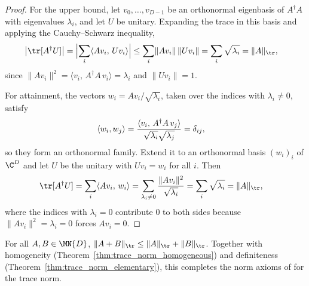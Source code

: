 \begin{proof}\leanok
    For the upper bound, let $v_0,\ldots,v_{D-1}$ be an orthonormal
    eigenbasis of $A^\dagger A$ with eigenvalues $\lambda_i$, and let $U$ be
    unitary. Expanding the trace in this basis and applying the
    Cauchy--Schwarz inequality,
    \begin{align}
        \bigl|\tr[A^\dagger U]\bigr|
        &=\Bigl|\sum_i\langle Av_i,\,Uv_i\rangle\Bigr|
          \leq\sum_i\lVert Av_i\rVert\,\lVert Uv_i\rVert
          =\sum_i\sqrt{\lambda_i}
          =\lVert A\rVert_{\tr},
        \notag
    \end{align}
    since $\lVert Av_i\rVert^2=\langle v_i,\,A^\dagger A\,v_i\rangle
    =\lambda_i$ and $\lVert Uv_i\rVert=1$.

    For attainment, the vectors $w_i=Av_i/\sqrt{\lambda_i}$, taken over the
    indices with $\lambda_i\neq0$, satisfy
    \begin{align}
        \langle w_i,w_j\rangle
        &=\frac{\langle v_i,\,A^\dagger A\,v_j\rangle}
              {\sqrt{\lambda_i}\sqrt{\lambda_j}}
          =\delta_{ij},
        \notag
    \end{align}
    so they form an orthonormal family. Extend it to an orthonormal basis
    $(w_i)_i$ of $\C^D$ and let $U$ be the unitary with $Uv_i=w_i$ for all
    $i$. Then
    \begin{align}
        \tr[A^\dagger U]
        &=\sum_i\langle Av_i,\,w_i\rangle
          =\sum_{\lambda_i\neq0}\frac{\lVert Av_i\rVert^2}{\sqrt{\lambda_i}}
          =\sum_i\sqrt{\lambda_i}
          =\lVert A\rVert_{\tr},
        \notag
    \end{align}
    where the indices with $\lambda_i=0$ contribute $0$ to both sides because
    $\lVert Av_i\rVert^2=\lambda_i=0$ forces $Av_i=0$.
\end{proof}

\begin{theorem}
    \label{thm:trace_norm_triangle}
    \leanok
    For all $A,B\in\MN{D}$,
    $\lVert A+B\rVert_{\tr}
    \leq\lVert A\rVert_{\tr}+\lVert B\rVert_{\tr}$.
    Together with homogeneity (Theorem~\ref{thm:trace_norm_homogeneous}) and
    definiteness (Theorem~\ref{thm:trace_norm_elementary}), this completes
    the norm axioms of \cite[Chapter~8, Section~8.1]{Wolf2012Quantum} for the
    trace norm.
\end{theorem}

